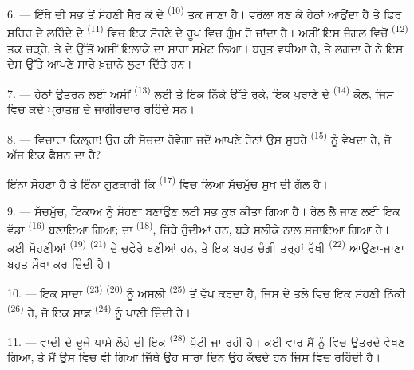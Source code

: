 \VUsaut{3.0mm}
\VUsaut{3.0mm}

6. --- ਇੱਥੇ ਦੀ ਸਭ ਤੋਂ ਸੋਹਣੀ ਸੈਰ ਕੋ ਦੇ  \textsuperscript{(10)} ਤਕ
ਜਾਣਾ ਹੈ।  ਵਰੋਲਾ ਬਣ ਕੇ ਹੇਠਾਂ ਆਉਂਦਾ ਹੈ ਤੇ ਫਿਰ ਸ਼ਹਿਰ ਦੇ ਲਹਿੰਦੇ
ਦੇ  \textsuperscript{(11)} ਵਿਚ ਇਕ ਸੋਹਣੇ  ਦੇ ਰੂਪ
ਵਿਚ ਗੁੰਮ ਹੋ ਜਾਂਦਾ ਹੈ। ਅਸੀਂ ਇਸ ਜੰਗਲ ਵਿਚੋਂ 
\textsuperscript{(12)} ਤਕ ਚੜ੍ਹੇ, ਤੇ  ਦੇ ਉੱਤੋਂ ਅਸੀਂ ਇਲਾਕੇ ਦਾ ਸਾਰਾ
 ਸਮੇਟ ਲਿਆ।  ਬਹੁਤ ਵਧੀਆ ਹੈ, ਤੇ
ਲਗਦਾ ਹੈ  ਨੇ ਇਸ ਦੇਸ ਉੱਤੇ ਆਪਣੇ ਸਾਰੇ ਖ਼ਜ਼ਾਨੇ ਲੁਟਾ ਦਿੱਤੇ ਹਨ।

7. --- ਹੇਠਾਂ ਉਤਰਨ ਲਈ ਅਸੀਂ  \textsuperscript{(13)} ਲਈ ਤੇ ਇਕ
ਨਿੱਕੇ  ਉੱਤੇ ਰੁਕੇ, ਇਕ ਪੁਰਾਣੇ  ਦੇ
 \textsuperscript{(14)} ਕੋਲ, ਜਿਸ ਵਿਚ ਕਦੇ ਪ੍ਰਾਤਜ਼ ਦੇ ਜਾਗੀਰਦਾਰ ਰਹਿੰਦੇ
ਸਨ।

8. --- ਵਿਚਾਰਾ ਕਿਲ੍ਹਾ! ਉਹ ਕੀ ਸੋਚਦਾ ਹੋਵੇਗਾ ਜਦੋਂ ਆਪਣੇ ਹੇਠਾਂ ਉਸ ਸੁਥਰੇ
 \textsuperscript{(15)} ਨੂੰ ਵੇਖਦਾ ਹੈ, ਜੋ ਅੱਜ ਇਕ ਫ਼ੈਸ਼ਨ ਦਾ
 ਹੈ?

 ਇੰਨਾ ਸੋਹਣਾ ਹੈ ਤੇ  ਇੰਨਾ ਗੁਣਕਾਰੀ ਕਿ
 \textsuperscript{(17)} ਵਿਚ ਲਿਆ  ਸੱਚਮੁੱਚ ਸੁਖ
ਦੀ ਗੱਲ ਹੈ।

\VUsaut{3.0mm}
\VUsaut{3.0mm}

9. --- ਸੱਚਮੁੱਚ, ਟਿਕਾਅ ਨੂੰ ਸੋਹਣਾ ਬਣਾਉਣ ਲਈ ਸਭ ਕੁਝ ਕੀਤਾ ਗਿਆ ਹੈ। ਰੇਲ ਲੈ ਜਾਣ ਲਈ ਇਕ
ਵੱਡਾ  \textsuperscript{(16)} ਬਣਾਇਆ ਗਿਆ;  ਦਾ
 \textsuperscript{(18)}, ਜਿੱਥੇ  ਹੁੰਦੀਆਂ
ਹਨ, ਬੜੇ ਸਲੀਕੇ ਨਾਲ ਸਜਾਇਆ ਗਿਆ ਹੈ। ਕਈ ਸੋਹਣੀਆਂ 
\textsuperscript{(19)}  \textsuperscript{(21)} ਦੇ ਚੁਫੇਰੇ ਬਣੀਆਂ ਹਨ, ਤੇ
ਇਕ ਬਹੁਤ ਚੰਗੀ ਤਰ੍ਹਾਂ ਰੱਖੀ  \textsuperscript{(22)} ਆਉਣਾ-ਜਾਣਾ ਬਹੁਤ
ਸੌਖਾ ਕਰ ਦਿੰਦੀ ਹੈ।

10. --- ਇਕ ਸਾਦਾ  \textsuperscript{(23)} 
\textsuperscript{(20)} ਨੂੰ ਅਸਲੀ  \textsuperscript{(25)} ਤੋਂ ਵੱਖ ਕਰਦਾ ਹੈ,
ਜਿਸ ਦੇ ਤਲੇ ਵਿਚ ਇਕ ਸੋਹਣੀ ਨਿੱਕੀ  \textsuperscript{(26)} ਹੈ, ਜੋ ਇਕ ਸਾਫ਼
 \textsuperscript{(24)} ਨੂੰ ਪਾਣੀ ਦਿੰਦੀ ਹੈ।

11. --- ਵਾਦੀ ਦੇ ਦੂਜੇ ਪਾਸੇ ਲੋਹੇ ਦੀ ਇਕ  \textsuperscript{(28)} ਪੁੱਟੀ ਜਾ
ਰਹੀ ਹੈ। ਕਈ ਵਾਰ ਮੈਂ  ਨੂੰ  ਵਿਚ ਉਤਰਦੇ ਵੇਖਣ ਗਿਆ, ਤੇ
ਮੈਂ ਉਸ  ਵਿਚ ਵੀ ਗਿਆ ਜਿੱਥੇ ਉਹ ਸਾਰਾ ਦਿਨ ਉਹ 
ਕੱਢਦੇ ਹਨ ਜਿਸ ਵਿਚ  ਰਹਿੰਦੀ ਹੈ।

